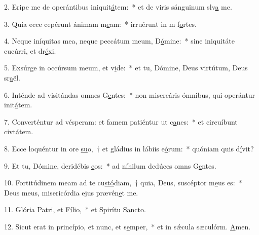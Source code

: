 2. Eripe me de operántibus iniquit\uline{á}tem:~* et de viris sánguinum slv\uline{a} me.\par 
3. Quia ecce cepérunt ánimam m\uline{e}am:~* irruérunt in m f\uline{o}rtes.\par 
4. Neque iníquitas mea, neque peccátum meum, D\uline{ó}mine:~* sine iniquitáte cucúrri, et dr\uline{é}xi.\par 
5. Exsúrge in occúrsum meum, et v\uline{i}de:~* et tu, Dómine, Deus virtútum, Deus sr\uline{a}ël.\par 
6. Inténde ad visitándas omnes G\uline{e}ntes:~* non misereáris ómnibus, qui operántur init\uline{á}tem.\par 
7. Converténtur ad vésperam: et famem patiéntur ut c\uline{a}nes:~* et circuíbunt civt\uline{á}tem.\par 
8. Ecce loquéntur in ore \uline{su}o,~† et gládius in lábiis e\uline{ó}rum:~* quóniam quis d\uline{í}vit?\par 
9. Et tu, Dómine, deridébis \uline{e}os:~* ad níhilum dedúces omns G\uline{e}ntes.\par 
10. Fortitúdinem meam ad te cu\uline{stó}diam,~† quia, Deus, suscéptor m\uline{e}us es:~* Deus meus, misericórdia ejus prævén\uline{e}t me.\par 
11. Glória Patri, et F\uline{í}lio,~* et Spirítu S\uline{a}ncto.\par 
12. Sicut erat in princípio, et nunc, et s\uline{e}mper,~* et in sǽcula sæculórm. \uline{A}men.\par 
